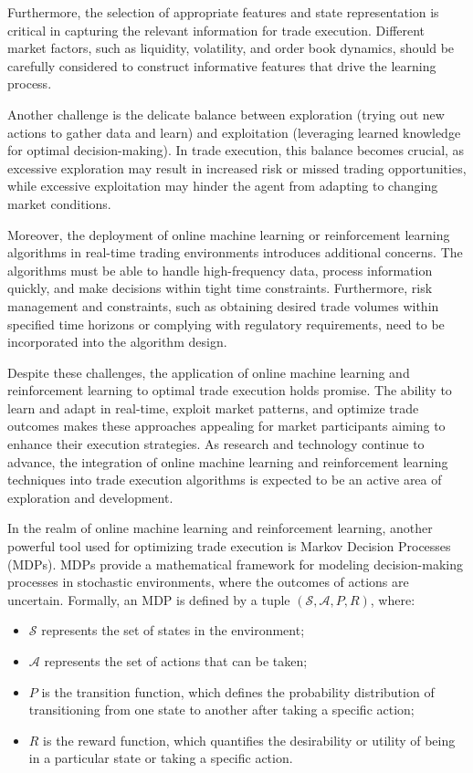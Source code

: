     Furthermore, the selection of appropriate features and state representation is critical in capturing the relevant information for trade execution. Different market factors, such as liquidity, volatility, and order book dynamics, should be carefully considered to construct informative features that drive the learning process.

    Another challenge is the delicate balance between exploration (trying out new actions to gather data and learn) and exploitation (leveraging learned knowledge for optimal decision-making). In trade execution, this balance becomes crucial, as excessive exploration may result in increased risk or missed trading opportunities, while excessive exploitation may hinder the agent from adapting to changing market conditions.

    Moreover, the deployment of online machine learning or reinforcement learning algorithms in real-time trading environments introduces additional concerns. The algorithms must be able to handle high-frequency data, process information quickly, and make decisions within tight time constraints. Furthermore, risk management and constraints, such as obtaining desired trade volumes within specified time horizons or complying with regulatory requirements, need to be incorporated into the algorithm design.

    Despite these challenges, the application of online machine learning and reinforcement learning to optimal trade execution holds promise. The ability to learn and adapt in real-time, exploit market patterns, and optimize trade outcomes makes these approaches appealing for market participants aiming to enhance their execution strategies. As research and technology continue to advance, the integration of online machine learning and reinforcement learning techniques into trade execution algorithms is expected to be an active area of exploration and development.

    In the realm of online machine learning and reinforcement learning, another powerful tool used for optimizing trade execution is Markov Decision Processes (MDPs). MDPs provide a mathematical framework for modeling decision-making processes in stochastic environments, where the outcomes of actions are uncertain. 
    Formally, an MDP is defined by a tuple $(\mathcal S, \mathcal A, P, R)$, where:
    \begin{itemize}
        \item $\mathcal S$ represents the set of states in the environment;
        \item $\mathcal A$ represents the set of actions that can be taken;
        \item $P$ is the transition function, which defines the probability distribution of transitioning from one state to another after taking a specific action;
        \item $R$ is the reward function, which quantifies the desirability or utility of being in a particular state or taking a specific action.
    \end{itemize}

